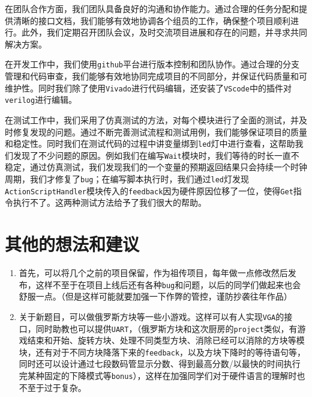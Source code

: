 \documentclass[12pt, a4paper]{ctexart}
\begin{document}
在团队合作方面，我们团队具备良好的沟通和协作能力。通过合理的任务分配和提供清晰的接口文档，我们能够有效地协调各个组员的工作，确保整个项目顺利进行。此外，我们定期召开团队会议，及时交流项目进展和存在的问题，并寻求共同解决方案。

在开发工作中，我们使用\texttt{github}平台进行版本控制和团队协作。通过合理的分支管理和代码审查，我们能够有效地协同完成项目的不同部分，并保证代码质量和可维护性。同时我们除了使用\texttt{Vivado}进行代码编辑，还安装了\texttt{VScode}中的插件对\texttt{verilog}进行编辑。

在测试工作中，我们采用了仿真测试的方法，对每个模块进行了全面的测试，并及时修复发现的问题。通过不断完善测试流程和测试用例，我们能够保证项目的质量和稳定性。同时我们在测试代码的过程中讲变量绑到\texttt{led}灯中进行查看，这帮助我们发现了不少问题的原因。例如我们在编写\texttt{Wait}模块时，我们等待的时长一直不稳定，通过仿真测试，我们发现我们的一个变量的预期返回结果只会持续一个时钟周期，我们才修复了\texttt{bug}；在编写脚本执行时，我们通过\texttt{led}灯发现\texttt{ActionScriptHandler}模块传入的\texttt{feedback}因为硬件原因位移了一位，使得\texttt{Get}指令执行不了。这两种测试方法给予了我们很大的帮助。

\section{其他的想法和建议}
\begin{enumerate}
\item 首先，可以将几个之前的项目保留，作为祖传项目，每年做一点修改然后发布，这样不至于在项目上线后还有各种\texttt{bug}和问题，以后的同学们做起来也会舒服一点。（但是这样可能就要加强一下作弊的管控，谨防抄袭往年作品）
\item 关于新题目，可以做俄罗斯方块等一些小游戏。这样可以有人实现\texttt{VGA}的接口，同时助教也可以提供\texttt{UART}，（俄罗斯方块和这次厨房的\texttt{project}类似，有游戏结束和开始、旋转方块、处理不同类型方块、消除已经可以消除的方块等模块，还有对于不同方块降落下来的\texttt{feedback}，以及方块下降时的等待语句等，同时还可以设计通过七段数码管显示分数、得到最高分数/以最快的时间执行完某种固定的下降模式等\texttt{bonus}），这样在加强同学们对于硬件语言的理解时也不至于过于复杂。
\end{enumerate}
\end{document}
